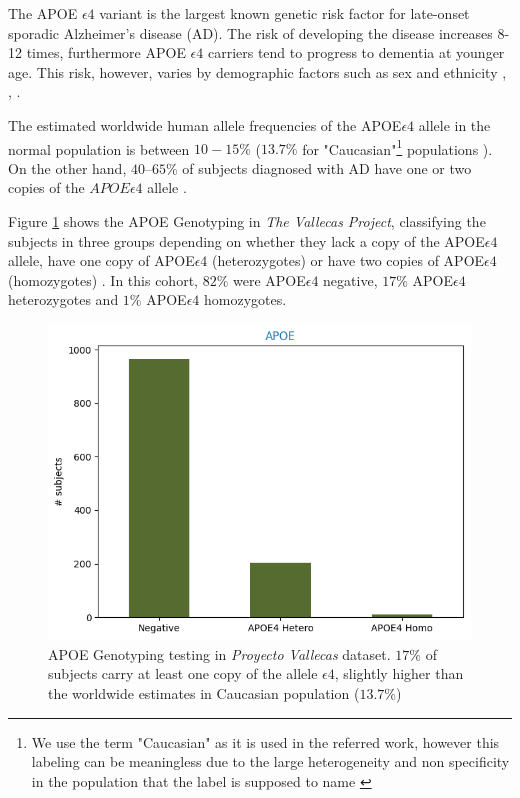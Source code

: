 \documentclass[11pt]{article}
\theoremstyle{definition}
\theoremstyle{remark}
\begin{document}
The APOE $\epsilon4$ variant is the largest known genetic risk factor for late-onset sporadic Alzheimer's disease (AD). The risk of developing the disease increases 8-12 times, furthermore APOE $\epsilon4$ carriers tend to progress to dementia at younger age. This risk, however, varies by demographic factors such as sex and ethnicity \cite{sepehrnia1989genetic}, \cite{mehta2007race}, \cite{helzner2008survival}. 

The estimated worldwide human allele frequencies of the APOE$\epsilon4$ allele in the normal population is between $10-15\%$\cite{myers1996apolipoprotein} ($13.7\%$ for "Caucasian"\footnote{We use the term "Caucasian" as it is used in the referred work, however this labeling can be meaningless due to the large heterogeneity and non specificity in the population that the label is supposed to name \cite{bhopal1998white}} populations \cite{corder1994protective}). 
On the other hand, $40–65\%$ of subjects diagnosed with AD have one or two copies of the $APOE\epsilon4$ allele \cite{saunders1993association}. 

Figure \ref{fig:apoe} shows the APOE Genotyping in \emph{The Vallecas Project}, classifying the subjects in three groups depending on whether they lack a copy of the APOE$\epsilon4$ allele, have one copy of APOE$\epsilon4$ (heterozygotes) or have two copies of APOE$\epsilon4$ (homozygotes) \cite{farrer1997effects}. In this cohort, $82\%$ were APOE$\epsilon4$ negative, $17\%$ APOE$\epsilon4$ heterozygotes and $1\%$ APOE$\epsilon4$ homozygotes. 

\begin{figure}[H]
        \centering
        \includegraphics[keepaspectratio, width=0.6\linewidth]{figures/Fig_apoe}
        \caption{APOE Genotyping testing in \emph{Proyecto Vallecas} dataset. $17\%$ of subjects carry at least one copy of the allele $\epsilon4$, slightly higher than the worldwide estimates in Caucasian population ($13.7\%$) \cite{farrer1997effects}} 
        \label{fig:apoe}
\end{figure}
\end{document}
